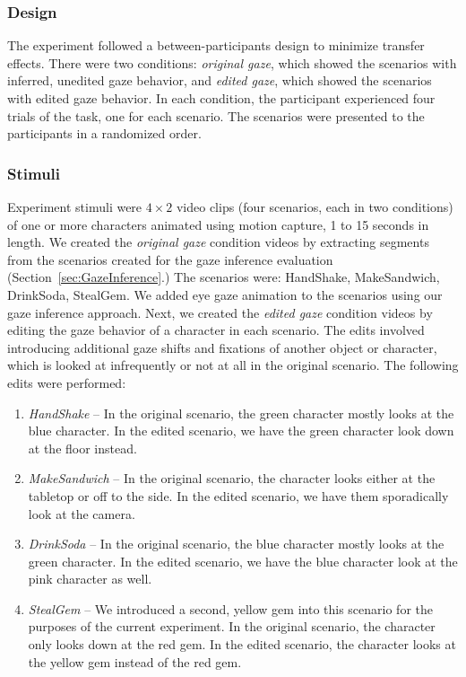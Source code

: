 \subsubsection{Design}

The experiment followed a between-participants design to minimize transfer effects. There were two conditions: \emph{original gaze}, which showed the scenarios with inferred, unedited gaze behavior, and \emph{edited gaze}, which showed the scenarios with edited gaze behavior. In each condition, the participant experienced four trials of the task, one for each scenario. The scenarios were presented to the participants in a randomized order.

\subsubsection{Stimuli}

Experiment stimuli were $4 \times 2$ video clips (four scenarios, each in two conditions) of one or more characters animated using motion capture, 1 to 15 seconds in length. We created the \emph{original gaze} condition videos by extracting segments from the scenarios created for the gaze inference evaluation (Section~\ref{sec:GazeInference}.) The scenarios were: HandShake, MakeSandwich, DrinkSoda, StealGem. We added eye gaze animation to the scenarios using our gaze inference approach. Next, we created the \emph{edited gaze} condition videos by editing the gaze behavior of a character in each scenario. The edits involved introducing additional gaze shifts and fixations of another object or character, which is looked at infrequently or not at all in the original scenario. The following edits were performed:

\begin{enumerate}
\item \emph{HandShake} -- In the original scenario, the green character mostly looks at the blue character. In the edited scenario, we have the green character look down at the floor instead.
\item \emph{MakeSandwich} -- In the original scenario, the character looks either at the tabletop or off to the side. In the edited scenario, we have them sporadically look at the camera.
\item \emph{DrinkSoda} -- In the original scenario, the blue character mostly looks at the green character. In the edited scenario, we have the blue character look at the pink character as well.
\item \emph{StealGem} -- We introduced a second, yellow gem into this scenario for the purposes of the current experiment. In the original scenario, the character only looks down at the red gem. In the edited scenario, the character looks at the yellow gem instead of the red gem.
\end{enumerate}

